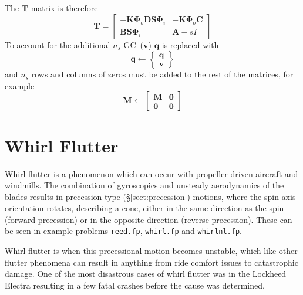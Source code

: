 \documentclass[10pt,openany,twoside]{book}
\numberwithin{equation}{section}   %
\newcommand{\Code}[1]{{\small\tt #1}}
\newcommand{\Matrix}[1]{\boldsymbol{#1}}
\newcommand{\Vector}[1]{\boldsymbol{#1}}
\newcommand{\Gc}{GC}
\newcommand{\Sectref}[1]{\S\ref{#1}}
\begin{document}
The $\Matrix{T}$ matrix is therefore
\begin{equation}
\Matrix{T} = \left[ \begin{array}{cc}
	-\Matrix{K\Phi}_o\Matrix{DS\Phi}_i & -\Matrix{K}\Matrix{\Phi}_o\Matrix{C} \\
	\Matrix{BS\Phi}_i  &  \Matrix{A} - sI
\end{array} \right]
\end{equation}
To account for the additional $n_s$ \Gc\ ($\Vector{v}$)
$\Vector{q}$ is replaced with
\begin{equation}
\Vector{q} \leftarrow \left\{ \begin{array}{c}
\Vector{q} \\
\Vector{v}
\end{array} \right\}
\end{equation}
and $n_s$ rows and columns of zeros must be added to
the rest of the matrices, for example
\begin{equation}
\Matrix{M} \leftarrow \left[ \begin{array}{cc}
\Matrix{M} & \Matrix{0}       \\
\Matrix{0} &  \Matrix{0}
\end{array} \right]
\end{equation}

\chapter{Whirl Flutter}\label{chap:whirl}
Whirl flutter is a phenomenon which can occur with propeller-driven aircraft
and windmills.
The combination of gyroscopics and unsteady aerodynamics of the blades
results in
precession-type (\Sectref{sect:precession})
motions, where the spin axis orientation rotates, describing a cone, either
in the same direction as the spin (forward precession) or in
the opposite direction (reverse precession).
These can be seen in example problems \Code{reed.fp}, \Code{whirl.fp} and \Code{whirlnl.fp}.

Whirl flutter is when this precessional motion becomes unstable,
which like other flutter phenomena can result in anything from
ride comfort issues to catastrophic damage.
One of the most disastrous cases of whirl flutter was in the Lockheed
Electra resulting in a few fatal crashes before the cause was
determined\cite{lockheedcrash}.
\end{document}
